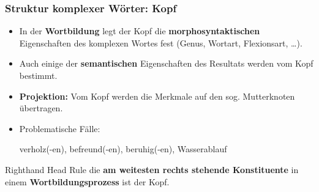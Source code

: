 \begin{frame}
\frametitle{Struktur komplexer Wörter: Kopf}

\begin{minipage}{.7\textwidth}


\begin{itemize}
	\item In der \textbf{Wortbildung} legt der Kopf die \textbf{morphosyntaktischen} Eigenschaften des komplexen Wortes fest (\zB Genus, Wortart, Flexionsart, \ldots ). 
	
	\item Auch einige der \textbf{semantischen} Eigenschaften des Resultats werden vom Kopf bestimmt.
	
	\item \textbf{Projektion:} Vom Kopf werden die Merkmale auf den sog. Mutterknoten übertragen.  
	
	\item Problematische Fälle:
		
		\ea verholz(-en), befreund(-en), beruhig(-en), Wasserablauf
		\z
		
\end{itemize}


\begin{block}{Righthand Head Rule}
	die \textbf{am weitesten rechts stehende Konstituente} in einem \textbf{Wortbildungsprozess} ist der Kopf.
\end{block}	

\end{minipage}
%
\hfill%
%
\begin{minipage}{.29\textwidth}

\begin{figure}	
	\centering


\end{figure}
\end{minipage}
\end{frame}
